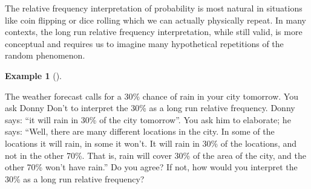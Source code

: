 \documentclass[
  letterpaper,
  DIV=11,
  numbers=noendperiod]{scrreprt}
\theoremstyle{plain}
\theoremstyle{definition}
\newtheorem{example}{Example}[chapter]
\theoremstyle{definition}
\theoremstyle{definition}
\theoremstyle{remark}
\begin{document}
The relative frequency interpretation of probability is most natural in
situations like coin flipping or dice rolling which we can actually
physically repeat. In many contexts, the long run relative frequency
interpretation, while still valid, is more conceptual and requires us to
imagine many hypothetical repetitions of the random phenomenon.

\begin{tcolorbox}[enhanced jigsaw, opacityback=0, left=2mm, colframe=quarto-callout-note-color-frame, toprule=.15mm, breakable, colback=white, leftrule=.75mm, arc=.35mm, rightrule=.15mm, bottomrule=.15mm]

\begin{example}[]\protect\hypertarget{exm-donny-weather-relfreq}{}\label{exm-donny-weather-relfreq}

The weather forecast calls for a 30\% chance of rain in your city
tomorrow. You ask Donny Don't to interpret the 30\% as a long run
relative frequency. Donny says: ``it will rain in 30\% of the city
tomorrow''. You ask him to elaborate; he says: ``Well, there are many
different locations in the city. In some of the locations it will rain,
in some it won't. It will rain in 30\% of the locations, and not in the
other 70\%. That is, rain will cover 30\% of the area of the city, and
the other 70\% won't have rain.'' Do you agree? If not, how would you
interpret the 30\% as a long run relative frequency?

\end{example}

\end{tcolorbox}
\end{document}
